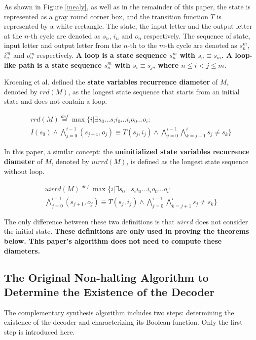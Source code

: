 \documentclass[journal]{IEEEtran}
\begin{document}
As shown in Figure \ref{mealy},
as well as in the remainder of this paper,
the state is represented as a gray round corner box,
and the transition function $T$ is represented by a white rectangle.
The state, the input letter and the output letter at the $n$-th cycle are denoted as $s_n$, $i_n$ and $o_n$ respectively.
The sequence of state, input letter and output letter from the $n$-th to the $m$-th cycle are denoted as $s_n^m$, $i_n^m$ and $o_n^m$ respectively.
\textbf{A loop is a state sequence $s_n^{m}$ with $s_n\equiv s_m$.
A loop-like path is a state sequence $s_n^{m}$ with $s_i\equiv s_j$,
where $n\le i< j\le m$.}


Kroening et al. \cite{RecDiam} defined the \textbf{state variables recurrence diameter} of $M$,
denoted by $rrd(M)$,
as the longest state sequence that starts from an initial state and does not contain a loop.

\begin{equation}\label{equ_svrd}
\begin{split}
&rrd(M)\overset{def}{=}\max\{i|\exists s_0 \dots s_i i_0 \dots i_i o_0 \dots o_i:\\
& I(s_0)\wedge \bigwedge^{i-1}_{j=0}(s_{j+1},o_j)\equiv T(s_j,i_j)\wedge\bigwedge^{i-1}_{j=0}\bigwedge^{i}_{k=j+1}s_{j}\ne s_{k}\}
\end{split}
\end{equation}

In this paper,
a similar concept: the \textbf{uninitialized state variables recurrence diameter} of $M$,
denoted by $uirrd(M)$,
is defined as the longest state sequence without loop.

\begin{equation}\label{equ_uisvrd}
\begin{split}
&uirrd(M)\overset{def}{=}\max\{i|\exists s_0 \dots s_i i_0 \dots i_i o_0 \dots o_i:\\
&\bigwedge^{i-1}_{j=0}(s_{j+1},o_j)\equiv T(s_j,i_j)\wedge\bigwedge^{i-1}_{j=0}\bigwedge^{i}_{k=j+1}s_{j}\ne s_{k}\}
\end{split}
\end{equation}

The only difference between these two definitions is that $uirrd$ does not consider the initial state.
\textbf{These definitions are only used in proving the theorems below.
This paper's algorithm does not need to compute these diameters.}

\subsection{The Original Non-halting Algorithm to Determine the Existence of the Decoder}\label{subsec_chkextdec}
The complementary synthesis algorithm\cite{ShengYuShen:iccad09} includes two steps:
determining the existence of the decoder and characterizing its Boolean function.
Only the first step is introduced here.
\end{document}

